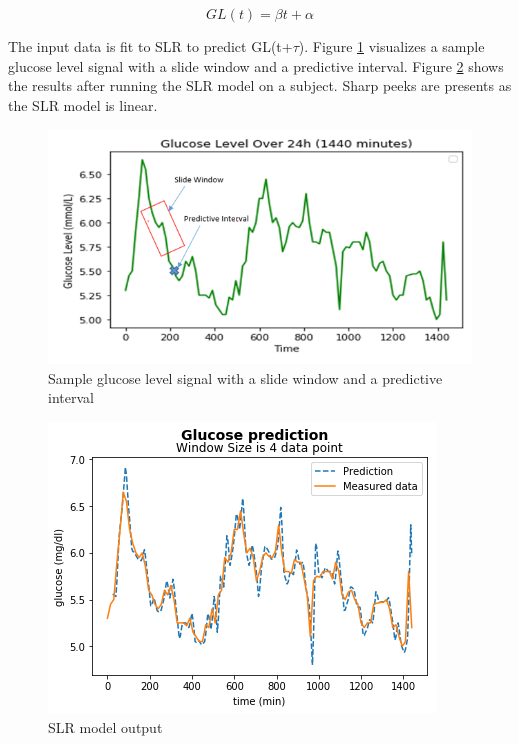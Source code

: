 \begin{equation}
GL(t) = \beta t + \alpha
\label{lr-eq}
\end{equation}

The input data is fit to SLR to predict GL(t+\ensuremath{\tau}). Figure \ref{slide-fig} visualizes a sample glucose level signal with a slide window and a predictive interval. Figure \ref{lr-fig} shows the results after running the SLR model on a subject. Sharp peeks are presents as the SLR model is linear.     

\begin{center}
\begin{figure}[ht!]
	\centering
    \includegraphics[width=\textwidth]{Figures/mo/slide.png}
 	\caption{Sample glucose level signal with a slide window and a predictive interval}
  	\label{slide-fig}
\end{figure}
\end{center}

\begin{center}
\begin{figure}[ht!]
	\centering
    \includegraphics[width=\textwidth]{Figures/mo/lr.png}
 	\caption{SLR model output}
  	\label{lr-fig}
  	
\end{figure}
\end{center}

